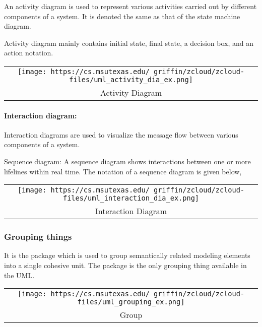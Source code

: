 \documentclass[
]{article}
\begin{document}
An activity diagram is used to represent various activities carried out
by different components of a system. It is denoted the same as that of
the state machine diagram.

Activity diagram mainly contains initial state, final state, a decision
box, and an action notation.

\begin{longtable}[]{@{}c@{}}
\toprule
\endhead
\texttt{[image: https://cs.msutexas.edu/~griffin/zcloud/zcloud-files/uml\_activity\_dia\_ex.png]}\tabularnewline
Activity Diagram\tabularnewline
\bottomrule
\end{longtable}

\hypertarget{interaction-diagram}{%
\paragraph{Interaction diagram:}\label{interaction-diagram}}

Interaction diagrams are used to visualize the message flow between
various components of a system.

Sequence diagram: A sequence diagram shows interactions between one or
more lifelines within real time. The notation of a sequence diagram is
given below,

\begin{longtable}[]{@{}c@{}}
\toprule
\endhead
\texttt{[image: https://cs.msutexas.edu/~griffin/zcloud/zcloud-files/uml\_interaction\_dia\_ex.png]}\tabularnewline
Interaction Diagram\tabularnewline
\bottomrule
\end{longtable}

\hypertarget{grouping-things}{%
\subsubsection{Grouping things}\label{grouping-things}}

It is the package which is used to group semantically related modeling
elements into a single cohesive unit. The package is the only grouping
thing available in the UML.

\begin{longtable}[]{@{}c@{}}
\toprule
\endhead
\texttt{[image: https://cs.msutexas.edu/~griffin/zcloud/zcloud-files/uml\_grouping\_ex.png]}\tabularnewline
Group\tabularnewline
\bottomrule
\end{longtable}
\end{document}
